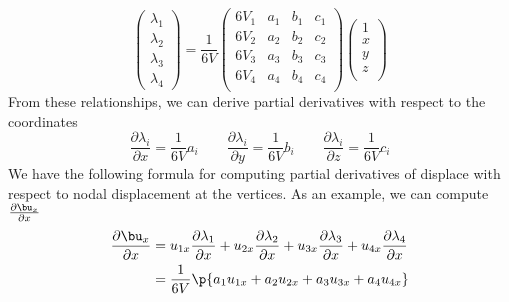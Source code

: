 \documentclass[11pt]{article}
\begin{document}
\[
    \begin{pmatrix}
        \lambda_1 \\
        \lambda_2 \\
        \lambda_3 \\
        \lambda_4
    \end{pmatrix}
    = 
    \frac{1}{6V}
    \begin{pmatrix}
        6V_1 & a_1 & b_1 & c_1 \\
        6V_2 & a_2 & b_2 & c_2 \\
        6V_3 & a_3 & b_3 & c_3 \\
        6V_4 & a_4 & b_4 & c_4 \\
    \end{pmatrix}
    \begin{pmatrix}
        1 \\
        x \\
        y \\
        z \\
    \end{pmatrix}    
\]
From these relationships, we can derive partial derivatives with respect to the coordinates 
\[
    \frac{\partial \lambda_i}{\partial x} = \frac{1}{6V} a_i 
    \quad \quad 
    \frac{\partial \lambda_i}{\partial y} = \frac{1}{6V} b_i
    \quad \quad
    \frac{\partial \lambda_i}{\partial z} = \frac{1}{6V} c_i 
\]
We have the following formula for computing partial derivatives of displace with respect to nodal displacement at the vertices. As an example, we can compute $\textstyle \frac{\partial \bu_x}{\partial x}$
\begin{align*}
    \frac{\partial \bu_x}{\partial x}
    &=    u_{1x} \frac{\partial \lambda_1}{\partial x} 
        + u_{2x} \frac{\partial \lambda_2}{\partial x}
        + u_{3x} \frac{\partial \lambda_3}{\partial x}
        + u_{4x} \frac{\partial \lambda_4}{\partial x} \\
    &= \frac{1}{6V} \p{
        a_1 u_{1x} + a_2 u_{2x} + a_3 u_{3x} + a_4 u_{4x}
    }    
\end{align*}
\end{document}
